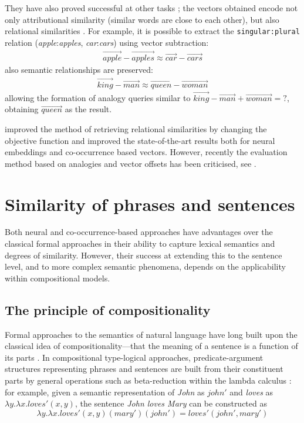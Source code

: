 They have also proved successful at other tasks \cite{mikolov2013linguistic}; the vectors obtained encode not only attributional similarity (similar words are close to each other), but also relational similarities \cite{Turney:2010:FMV:1861751.1861756}. For example, it is possible to extract the \texttt{singular:plural} relation (\textit{apple}:\textit{apples}, \textit{car}:\textit{cars}) using vector subtraction:
%
\begin{align*}
  \overrightarrow{\mathit{apple}} - \overrightarrow{\mathit{apples}}
  \approx
  \overrightarrow{\mathit{car}} - \overrightarrow{\mathit{cars}}
\end{align*}
%
also semantic relationships are preserved:
%
\begin{align*}
  \overrightarrow{\mathit{king}} - \overrightarrow{\mathit{man}}
  \approx
  \overrightarrow{\mathit{queen}} - \overrightarrow{\mathit{woman}}
\end{align*}
%
allowing the formation of analogy queries similar to
$\overrightarrow{\mathit{king}} - \overrightarrow{\mathit{man}} +
\overrightarrow{\mathit{woman}} = \mathtt{?}$, obtaining
$\overrightarrow{\mathit{queen}}$ as the
result.

 improved the method of retrieving relational similarities by changing the objective function and improved the state-of-the-art results both for neural embeddings and co-occurrence based vectors. However, recently the evaluation method based on analogies and vector offsets has been criticised, see \cite{linzen:2016:RepEval}.

\section{Similarity of phrases and sentences}
\label{sec:similarity-compounds}

Both neural and co-occurrence-based approaches have advantages over
the classical formal approaches in their ability to capture lexical
semantics and degrees of similarity. However, their success at extending this to the sentence level, and to more complex semantic phenomena, depends on the applicability within compositional models.

\subsection{The principle of compositionality}
\label{sec:formal-semantics}

Formal approaches to the semantics of natural language have long built upon the
classical idea of compositionality---that the meaning of a sentence is a
function of its parts \cite{Janssen2001}. In compositional type-logical
approaches, predicate-argument structures representing phrases and sentences are
built from their constituent parts by general operations such as beta-reduction
within the lambda calculus \cite{THEO:THEO373}: for example, given a semantic
representation of \emph{John} as $\mathit{john}'$ and \emph{loves} as
$\lambda y.\lambda x.\mathit{loves}'(x, y)$, the sentence \emph{John loves Mary}
can be constructed as
$$
\lambda y.\lambda
x.\mathit{loves}'(x, y)(\mathit{mary}')(\mathit{john}') =
\mathit{loves}'(\mathit{john}', \mathit{mary}')
$$

